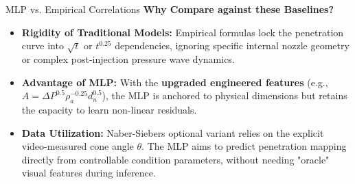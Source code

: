 \documentclass[UTF8,aspectratio=169]{ctexbeamer}
\begin{document}
\begin{frame}{MLP vs. Empirical Correlations}
\textbf{Why Compare against these Baselines?}
\begin{itemize}
    \item \textbf{Rigidity of Traditional Models:} Empirical formulas lock the penetration curve into $\sqrt{t}$ or $t^{0.25}$ dependencies, ignoring specific internal nozzle geometry or complex post-injection pressure wave dynamics.
    \item \textbf{Advantage of MLP:} With the \textbf{upgraded engineered features} (e.g., $A=\Delta P^{0.5}\rho_a^{-0.25}d_n^{0.5}$), the MLP is anchored to physical dimensions but retains the capacity to learn non-linear residuals.
    \item \textbf{Data Utilization:} Naber-Siebers optional variant relies on the explicit video-measured cone angle $\theta$. The MLP aims to predict penetration mapping directly from controllable condition parameters, without needing "oracle" visual features during inference.
\end{itemize}
\end{frame}
\end{document}
